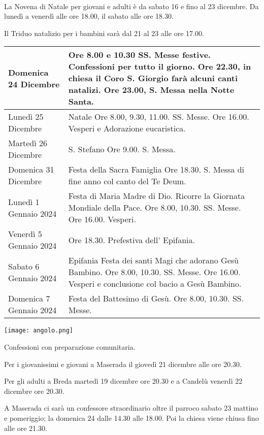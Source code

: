 \small

\noindent{}
\\

La Novena di Natale per giovani e adulti è da sabato 16 e fino al 23 dicembre. Da lunedì a venerdì alle ore 18.00, il sabato alle ore 18.30.

Il Triduo natalizio per i bambini sarà dal 21 al 23 alle ore 17.00.

\begin{center}
\begin{tabular}{ m{} m{} }
\hline
Domenica 24 Dicembre &
Ore 8.00 e 10.30 SS. Messe festive.
Confessioni per tutto il giorno.
Ore 22.30, in chiesa il Coro S. Giorgio farà alcuni canti natalizi.
Ore 23.00, S. Messa nella Notte Santa.
\\
\hline
Lunedì 25 Dicembre &
Natale
Ore 8.00, 9.30, 11.00. SS. Messe.
Ore 16.00. Vesperi e Adorazione eucaristica.
\\
\hline
Martedì 26 Dicembre &
S. Stefano
Ore 9.00. S. Messa.
\\
\hline
Domenica 31 Dicembre &
Festa della Sacra Famiglia
Ore 18.30. S. Messa di fine anno col canto del Te Deum.
\\
\hline
Lunedì 1 Gennaio 2024 &
Festa di Maria Madre di Dio.
Ricorre la Giornata Mondiale della Pace.
Ore 8.00, 10.30. SS. Messe.
Ore 16.00. Vesperi.
\\
\hline
Venerdì 5 Gennaio 2024 &
Ore 18.30. Prefestiva dell’ Epifania.
\\
\hline
Sabato 6 Gennaio 2024 &
Epifania
Festa dei santi Magi che adorano Gesù Bambino.
Ore 8.00, 10.30. SS. Messe.
Ore 16.00. Vesperi e conclusione col bacio a Gesù Bambino. 
\\
\hline
Domenica 7 Gennaio 2024 &
Festa del Battesimo di Gesù.
Ore 8.00, 10.30. SS. Messe.
\\
\hline
\end{tabular}
\end{center}


\begin{minipage}{0.25\textwidth}
\texttt{[image: angolo.png]}
\end{minipage}
\hfill
\begin{minipage}{0.65\textwidth}
Confessioni con preparazione comunitaria.

Per i giovanissimi e giovani a Maserada il giovedì 21 dicembre alle ore 20.30.

Per gli adulti a Breda martedì 19 dicembre ore 20.30 e a Candelù venerdì 22 dicembre ore 20.30.

A Maserada ci sarà un confessore straordinario oltre il parroco sabato 23 mattino e pomeriggio; la domenica 24 dalle 14.30 alle 18.00. Poi la chiesa viene chiusa fino alle ore 21.30.
\end{minipage}
\normalsize
